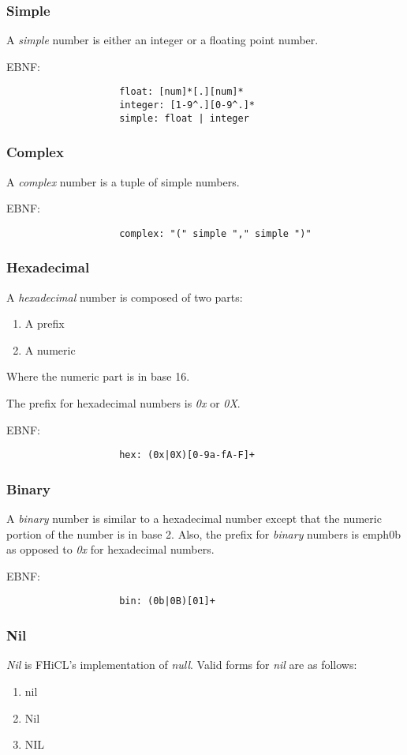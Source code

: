 \documentclass{memarticle}
\begin{document}
{			\subsubsection{Simple}
				A \emph{simple} number is either an integer
				or a floating point number.
				\par
				EBNF:
				\begin{verbatim}
					float: [num]*[.][num]*
					integer: [1-9^.][0-9^.]*
					simple: float | integer
				\end{verbatim}
			\subsubsection{Complex}
				A \emph{complex} number is a tuple of simple numbers.
				\par
				EBNF:
				\begin{verbatim}
					complex: "(" simple "," simple ")" 
				\end{verbatim}
			\subsubsection{Hexadecimal}
				A \emph{hexadecimal} number is composed of two parts:
				\begin{enumerate}
					\item A prefix
					\item A numeric
				\end{enumerate}
				Where the numeric part is in base 16.
				\par
				The prefix for hexadecimal numbers is \emph{0x}
				or \emph{0X}.
				\par
				EBNF:
				\begin{verbatim}
					hex: (0x|0X)[0-9a-fA-F]+
				\end{verbatim}
			\subsubsection{Binary}
				A \emph{binary} number is similar to a hexadecimal number except that
				the numeric portion of the number is in base 2.
				Also, the prefix for \emph{binary} numbers is emph{0b} as opposed to
				\emph{0x} for hexadecimal numbers.
				\par
				EBNF:
				\begin{verbatim}
					bin: (0b|0B)[01]+
				\end{verbatim}
			\subsubsection{Nil}
				\emph{Nil} is FHiCL's implementation of \emph{null}.
				Valid forms for \emph{nil} are as follows:
				\begin{enumerate}
					\item nil
					\item Nil
					\item NIL
				\end{enumerate}
}
\end{document}
